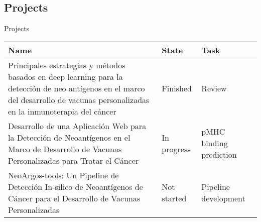 \documentclass[10pt]{beamer}
\newcommand{\1}{
	\setbeamertemplate{background}{
		\texttt{[image: ../img/1]}
		\tikz[overlay] \fill[fill opacity=0.75,fill=white] (0,0) rectangle (-\paperwidth,\paperheight);
	}
}
\begin{document}
	\subsection{Projects}
	
	\begin{frame}{Projects}{}	
		
		
	\begin{table}[]
	
		\small
		\setlength{\tabcolsep}{0.5em} %
		{\renewcommand{\arraystretch}{1.4}%
		\begin{tabular}{p{6cm}lp{2cm}}
			\textbf{Name}                                                                                                                                                                     & \textbf{State} & \textbf{Task}           \\ \hline
			Principales estrategias y métodos basados en deep learning para la detección de neo antígenos en el marco del desarrollo de vacunas personalizadas en la inmunoterapia del cáncer & Finished       & Review                  \\ \hline
			Desarrollo de una Aplicación Web para la Detección de Neoantígenos en el Marco de Desarrollo de Vacunas Personalizadas para Tratar el Cáncer                                      & In progress    & pMHC binding prediction \\ \hline
			NeoArgos-tools: Un Pipeline de Detección In-silico de Neoantígenos de Cáncer para el Desarrollo de Vacunas Personalizadas                                                         & Not started    & Pipeline development  
		\end{tabular}}
	
	\end{table}
					
		
	\end{frame}
	
\end{document}
